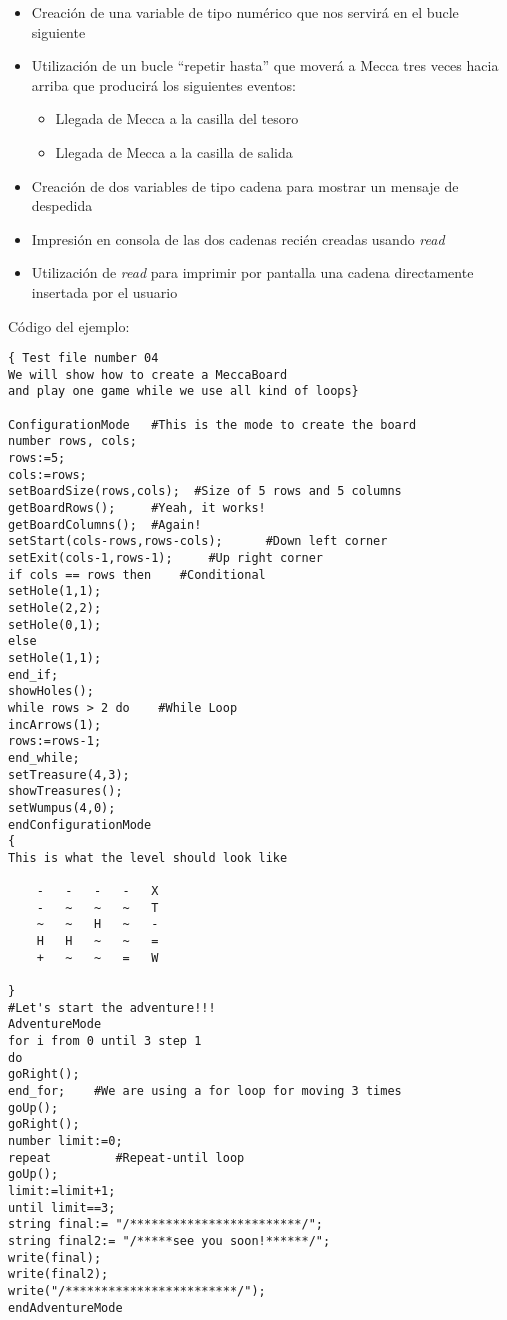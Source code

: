 \documentclass[a4paper,12pt,twoside,openright]{report}
\begin{document}
\begin{itemize}
\begin{itemize}
      \item Creación de una variable de tipo numérico que nos servirá en el bucle siguiente
      \item Utilización de un bucle ``repetir hasta'' que moverá a Mecca tres veces hacia arriba que producirá los siguientes eventos:
      \begin{itemize}
      \item Llegada de Mecca a la casilla del tesoro
      \item Llegada de Mecca a la casilla de salida
      \end{itemize}
      \item Creación de dos variables de tipo cadena para mostrar un mensaje de despedida
      \item Impresión en consola de las dos cadenas recién creadas usando \emph{read}
      \item Utilización de \emph{read} para imprimir por pantalla una cadena directamente insertada por el usuario
      \end{itemize}
   \end{itemize}
  
  Código del ejemplo:
  \begin{lstlisting}
{ Test file number 04
We will show how to create a MeccaBoard 
and play one game while we use all kind of loops}

ConfigurationMode   #This is the mode to create the board
number rows, cols;
rows:=5;
cols:=rows;
setBoardSize(rows,cols);  #Size of 5 rows and 5 columns
getBoardRows();     #Yeah, it works!
getBoardColumns();  #Again!
setStart(cols-rows,rows-cols);      #Down left corner
setExit(cols-1,rows-1);	    #Up right corner
if cols == rows then    #Conditional
setHole(1,1);	    
setHole(2,2);
setHole(0,1);
else
setHole(1,1);
end_if;
showHoles();
while rows > 2 do    #While Loop
incArrows(1);
rows:=rows-1;
end_while;
setTreasure(4,3);
showTreasures();
setWumpus(4,0);
endConfigurationMode
{
This is what the level should look like

	-	-	-	-	X
	-	~	~	~	T
	~	~	H	~	-
	H	H	~	~	=
	+	~	~	=	W

}
#Let's start the adventure!!!
AdventureMode
for i from 0 until 3 step 1
do
goRight();
end_for;	#We are using a for loop for moving 3 times
goUp();		
goRight();
number limit:=0;
repeat         #Repeat-until loop
goUp();
limit:=limit+1;
until limit==3;
string final:= "/************************/";
string final2:= "/*****see you soon!******/";
write(final);
write(final2);
write("/************************/");
endAdventureMode
  \end{lstlisting}
\end{document}
